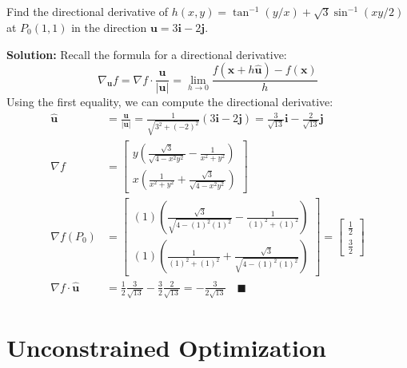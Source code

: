 \documentclass[letterpaper, 11pt]{article}
\begin{document}
\subsection{} Find the directional derivative of $h(x,y) = \tan^{-1} (y/x) + \sqrt{3} \sin^{-1} (xy/2)$ at $P_0(1,1)$ in the direction $\bm{u} = 3\bm{i} - 2 \bm{j}$.
\par \textbf{Solution:} Recall the formula for a directional derivative:
\[ \nabla_{\bm{u}} f = \nabla f \cdot \frac{\bm{u}}{|\bm{u}|} = \lim_{h \to 0}\frac{ f(\bm{x} + h \bm{\hat u}) - f(\bm{x})}{h} \]
Using the first equality, we can compute the directional derivative:
\begin{align*}
\bm{\hat u} &= \frac{ \bm{u}}{|\bm{u}|} = \frac{1}{\sqrt{ 3^2 + (-2)^2}} \left( 3\bm{i} - 2 \bm{j} \right) = \frac{3}{\sqrt{13}} \bm{i} - \frac{2}{\sqrt{13}} \bm{j} \\
\nabla f &= \left[ \begin{array}{c}  y \left( \frac{\sqrt{3}}{\sqrt{4 - x^2y^2}} - \frac{1}{x^2 + y^2} \right)  \\  x \left( \frac{1}{x^2 + y^2} + \frac{\sqrt{3}}{\sqrt{4 - x^2y^2}}  \right)   \end{array} \right] \\
\nabla f(P_0) &= \left[ \begin{array}{c}  (1) \left( \frac{\sqrt{3}}{\sqrt{4 - (1)^2(1)^2}} - \frac{1}{(1)^2 + (1)^2} \right)  \\  (1) \left( \frac{1}{(1)^2 + (1)^2} + \frac{\sqrt{3}}{\sqrt{4 - (1)^2(1)^2}}  \right)   \end{array} \right] = \left[ \begin{array}{c}  \frac{1}{2} \\ \frac{3}{2}   \end{array} \right] \\
\nabla f \cdot \bm{\hat u} &= \frac{1}{2} \frac{3}{\sqrt{13}} - \frac{3}{2} \frac{2}{\sqrt{13}} = -\frac{3}{2 \sqrt{13}} \quad \blacksquare 
\end{align*}
 

\section{Unconstrained Optimization}
\end{document}
